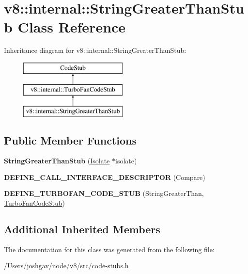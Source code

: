 \hypertarget{classv8_1_1internal_1_1_string_greater_than_stub}{}\section{v8\+:\+:internal\+:\+:String\+Greater\+Than\+Stub Class Reference}
\label{classv8_1_1internal_1_1_string_greater_than_stub}
Inheritance diagram for v8\+:\+:internal\+:\+:String\+Greater\+Than\+Stub\+:\begin{figure}[H]
\begin{center}
\leavevmode
\includegraphics[height=3.000000cm]{classv8_1_1internal_1_1_string_greater_than_stub}
\end{center}
\end{figure}
\subsection*{Public Member Functions}
\begin{DoxyCompactItemize}
\item 
{\bfseries String\+Greater\+Than\+Stub} (\hyperlink{classv8_1_1internal_1_1_isolate}{Isolate} $\ast$isolate)\hypertarget{classv8_1_1internal_1_1_string_greater_than_stub_a474532444ae163cc5df0ebd4a9bcea50}{}\label{classv8_1_1internal_1_1_string_greater_than_stub_a474532444ae163cc5df0ebd4a9bcea50}

\item 
{\bfseries D\+E\+F\+I\+N\+E\+\_\+\+C\+A\+L\+L\+\_\+\+I\+N\+T\+E\+R\+F\+A\+C\+E\+\_\+\+D\+E\+S\+C\+R\+I\+P\+T\+OR} (Compare)\hypertarget{classv8_1_1internal_1_1_string_greater_than_stub_a60a9f78dfad8bf99c8fa3906dc833c68}{}\label{classv8_1_1internal_1_1_string_greater_than_stub_a60a9f78dfad8bf99c8fa3906dc833c68}

\item 
{\bfseries D\+E\+F\+I\+N\+E\+\_\+\+T\+U\+R\+B\+O\+F\+A\+N\+\_\+\+C\+O\+D\+E\+\_\+\+S\+T\+UB} (String\+Greater\+Than, \hyperlink{classv8_1_1internal_1_1_turbo_fan_code_stub}{Turbo\+Fan\+Code\+Stub})\hypertarget{classv8_1_1internal_1_1_string_greater_than_stub_afdf09e6a5b3f8574ae7c87f328af3aa0}{}\label{classv8_1_1internal_1_1_string_greater_than_stub_afdf09e6a5b3f8574ae7c87f328af3aa0}

\end{DoxyCompactItemize}
\subsection*{Additional Inherited Members}


The documentation for this class was generated from the following file\+:\begin{DoxyCompactItemize}
\item 
/\+Users/joshgav/node/v8/src/code-\/stubs.\+h\end{DoxyCompactItemize}
